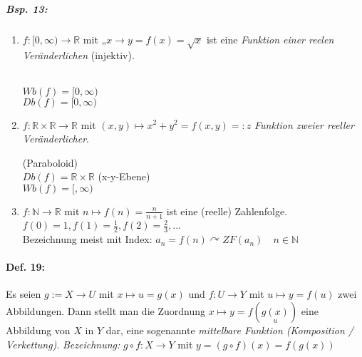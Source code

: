 \subparagraph{Bsp. 13:}
\begin{enumerate} [label=\alph*)]
\item $f:[0,\infty) \rightarrow \mathbb{R}$ mit „$x \rightarrow y = f(x) = \sqrt{x}$ ist eine \emph{Funktion einer reelen Veränderlichen} (injektiv).\\
\\
$Wb(f)=[0,\infty)$\\
$Db(f)=[0,\infty)$
\item $f: \mathbb{R}\times \mathbb{R}\rightarrow \mathbb{R}$ mit $(x,y) \longmapsto x^2 +y^2=f(x,y) =: z$ \emph{Funktion zweier reeller Veränderlicher}.\\
(Paraboloid)\\
$Db(f) = \mathbb{R} \times \mathbb{R}$ (x-y-Ebene)\\
$Wb(f)=[,\infty)$
\item $f: \mathbb{N} \rightarrow \mathbb{R}$ mit $n\longmapsto f(n) = \frac{n}{n+1}$ ist eine (reelle) Zahlenfolge. $f(0)=1, f(1)=\frac{1}{2}, f(2)=\frac{2}{3}, ...$\\
Bezeichnung meist mit Index: $a_n=f(n) \curvearrowright ZF(a_n) \quad n \in \mathbb{N}$
\end{enumerate}

\paragraph{Def. 19:} \parskp
Es seien $g:=X\rightarrow U$ mit $x\longmapsto u=g(x)$ und $f: U\rightarrow Y$ mit $u\longmapsto y = f(u)$ zwei Abbildungen. Dann stellt man die Zuordnung $x\longmapsto y = f(\underset{u}{g(x)})$ eine Abbildung von $X$ in $Y$ dar, eine sogenannte \emph{mittelbare Funktion (Komposition / Verkettung)}.
\emph{Bezeichnung:} $g \circ f: X \rightarrow Y$ mit $y=(g \circ f) (x) = f(g(x))$

